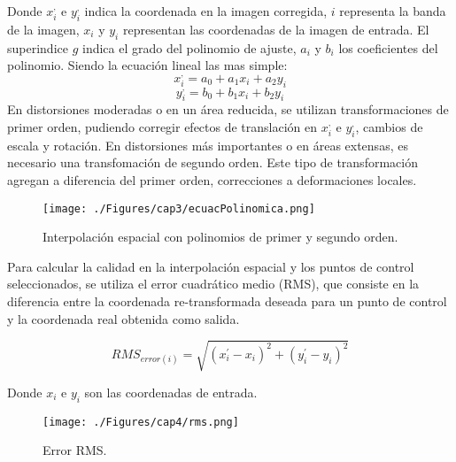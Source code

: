 

Donde $ x^{,}_{i} $ e $ y^{,}_{i} $ indica la coordenada en la imagen corregida, $ i $ representa la banda de la imagen, $ x_{i} $ y $ y_{i} $ representan las coordenadas de la imagen de entrada. El superindice $ g $ indica el grado del polinomio de ajuste, $ a_{i} $ y $ b_{i} $ los coeficientes del polinomio. Siendo la ecuaci\'on lineal las mas simple:
	\begin{equation}
	x^{,}_{i} = a_{0}+a_{1}x_{i}+a_{2}y_{i}
	\end{equation} 
		\begin{equation}
		y^{,}_{i} = b_{0}+b_{1}x_{i}+b_{2}y_{i}
		\end{equation} 
En distorsiones moderadas o en un \'area reducida, se utilizan transformaciones de primer orden, pudiendo corregir efectos de translaci\'on en $ x^{,}_{i} $ e $ y^{,}_{i} $, cambios de escala y rotaci\'on.
En distorsiones m\'as importantes o en \'areas extensas, es necesario una transfomaci\'on de segundo orden. Este tipo de transformaci\'on agregan a diferencia del primer orden, correcciones a deformaciones locales.
    \begin{figure}[H]
    	\centering
    	\texttt{[image: ./Figures/cap3/ecuacPolinomica.png]}
    	\caption{Interpolaci\'on espacial con polinomios de primer y segundo orden.}
    	\label{fig:intPolEcua}
    \end{figure}
 Para calcular la calidad en la interpolaci\'on espacial y los puntos de control seleccionados, se utiliza el error cuadrático medio (RMS), que consiste en la diferencia entre la coordenada re-transformada deseada para un punto de control y la coordenada real obtenida como salida.

 \begin{equation}
 RMS_{error(i)} = \sqrt{(x_{i}^{'}-x_{i})^{2}+(y_{i}^{'}-y_{i})^{2}}
 \end{equation} 
 
 Donde $ x_{i} $ e $ y_{i} $ son las coordenadas de entrada.
 
     \begin{figure}[H]
     	\centering
     	\texttt{[image: ./Figures/cap4/rms.png]}
     	\caption{Error RMS.}
     	\label{fig:rms}
     \end{figure}



